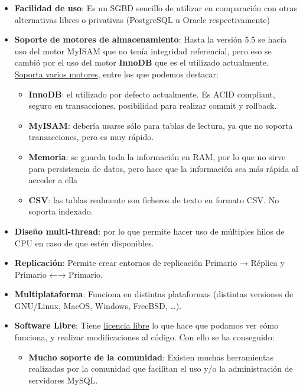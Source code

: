 \begin{itemize}
    \item \textbf{Facilidad de uso}: Es un SGBD sencillo de utilizar en comparación con otras alternativas libres o privativas (PostgreSQL u Oracle respectivamente)
    \item \textbf{Soporte de motores de almacenamiento}: Hasta la versión 5.5 se hacía uso del motor MyISAM que no tenía integridad referencial, pero eso se cambió por el uso del motor \textbf{InnoDB} que es el utilizado actualmente. \href{https://dev.mysql.com/doc/refman/8.0/en/storage-engines.html}{Soporta varios motores}, entre los que podemos destacar:

    \begin{itemize}
        \item \textbf{InnoDB}: el utilizado por defecto actualmente. Es ACID compliant, seguro en transacciones, posibilidad para realizar commit y rollback.
        \item \textbf{MyISAM}: debería usarse sólo para tablas de lectura, ya que no soporta transacciones, pero es muy rápido.
        \item \textbf{Memoria}: se guarda toda la información en RAM, por lo que no sirve para persistencia de datos, pero hace que la información sea más rápida al acceder a ella
        \item \textbf{CSV}: las tablas realmente son ficheros de texto en formato CSV. No soporta indexado.
    \end{itemize}

    \item \textbf{Diseño multi-thread}: por lo que permite hacer uso de múltiples hilos de CPU en caso de que estén disponibles.
    \item \textbf{Replicación}: Permite crear entornos de replicación Primario → Réplica y Primario ←→ Primario.
    \item \textbf{Multiplataforma}: Funciona en distintas plataformas (distintas versiones de GNU/Linux, MacOS, Windows, FreeBSD, …).
    \item \textbf{Software Libre}: Tiene \hyperlink{licencias_libres}{licencia libre} lo que hace que podamos ver cómo funciona, y realizar modificaciones al código. Con ello se ha conseguido:
    \begin{itemize}
        \item \textbf{Mucho soporte de la comunidad}: Existen muchas herramientas realizadas por la comunidad que facilitan el uso y/o la administración de servidores MySQL.
    \end{itemize}
\end{itemize}

